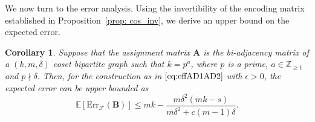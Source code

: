 \documentclass[journal,draftcls,onecolumn]{IEEEtran}
\theoremstyle{mystyle}
\newtheorem{cor}{Corollary}
\newcommand{\bfD}{\mathbf{D}}
\newcommand{\bfA}{\mathbf{A}}
\newcommand{\aditya}[1]{\marginpar{+}{\bf Aditya's remark}: {\em #1}}
\begin{document}
We now turn to the error analysis. Using the invertibility of the encoding
matrix established in Proposition~\ref{prop: cos_inv}, we derive an
upper bound on the expected error.





\begin{cor}  \label{cor:bipartite}
Suppose that the assignment matrix $\bfA$ is the bi-adjacency matrix of a $(k,m,\delta)$ coset bipartite graph such that $k = p^a$, where $p$ is a prime, $a \in \mathbb{Z}_{\ge 1}$ and $p \nmid \delta$. Then, for the construction as in $\eqref{eq:effAD1AD2}$ with $\epsilon > 0$,
the expected error can be upper bounded as
\begin{equation} \label{eq:AD1AD2err_Coset}
\mathbb{E}[\text{Err}_{\mathcal{F}}(\mathbf{B})] \le mk - \frac{m\delta^2(mk-s)}{m\delta^2 + c(m-1)\delta}.
\end{equation}
\end{cor}
\end{document}
